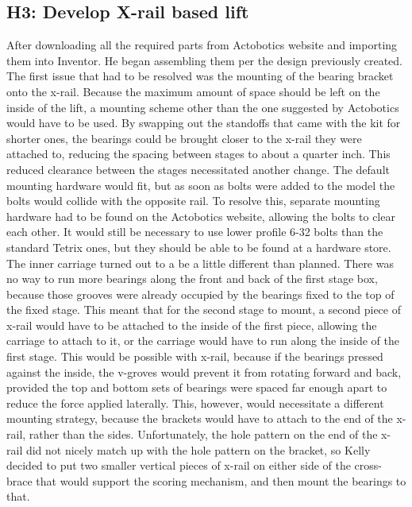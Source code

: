 \documentclass{article}
\begin{document}
\subsection{H3: Develop X-rail based lift}

 After downloading all the required parts from Actobotics website and importing them into Inventor. He began assembling them per the design previously created. The first issue that had to be resolved was the mounting of the bearing bracket onto the x-rail. Because the maximum amount of space should be left on the inside of the lift, a mounting scheme other than the one suggested by Actobotics would have to be used. By swapping out the standoffs that came with the kit for shorter ones, the bearings could be brought closer to the x-rail they were attached to, reducing the spacing between stages to about a quarter inch. This reduced clearance between the stages necessitated another change. The default mounting hardware would fit, but as soon as bolts were added to the model the bolts would collide with the opposite rail. To resolve this, separate mounting hardware had to be found on the Actobotics website, allowing the bolts to clear each other. It would still be necessary to use lower profile 6-32 bolts than the standard Tetrix ones, but they should be able to be found at a hardware store. The inner carriage turned out to a be a little different than planned. There was no way to run more bearings along the front and back of the first stage box, because those grooves were already occupied by the bearings fixed to the top of the fixed stage. This meant that for the second stage to mount, a second piece of x-rail would have to be attached to the inside of the first piece, allowing the carriage to attach to it, or the carriage would have to run along the inside of the first stage. This would be possible with x-rail, because if the bearings pressed against the inside, the v-groves would prevent it from rotating forward and back, provided the top and bottom sets of bearings were spaced far enough apart to reduce the force applied laterally. This, however, would necessitate a different mounting strategy, because the brackets would have to attach to the end of the x-rail, rather than the sides. Unfortunately, the hole pattern on the end of the x-rail did not nicely match up with the hole pattern on the bracket, so Kelly decided to put two smaller vertical pieces of x-rail on either side of the cross-brace that would support the scoring mechanism, and then mount the bearings to that. 
 
\end{document}
